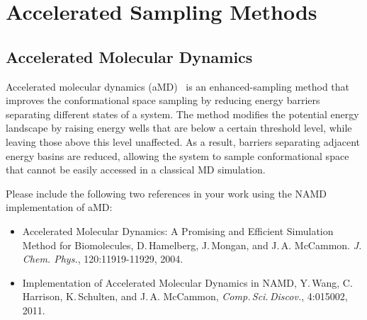 \section{Accelerated Sampling Methods}
\label{section:accel}

\subsection{Accelerated Molecular Dynamics}
\label{section:accelmd}
Accelerated molecular dynamics (aMD)~\cite{HAME2004mc} is an enhanced-sampling method that
improves the conformational space sampling by 
reducing energy barriers separating different states of a system.
The method modifies the potential 
energy landscape by raising energy wells that are below
a certain threshold level, while leaving those above this level unaffected.
As a result, barriers separating adjacent energy basins are reduced, allowing the system to sample
conformational space that cannot be easily accessed in a classical MD simulation.

Please include the following two references in your work using the NAMD implementation of aMD:
\begin{itemize}
  \item {Accelerated Molecular Dynamics: A Promising and Efficient Simulation Method for Biomolecules, D.\,Hamelberg, J.\,Mongan, and J.\,A. McCammon. {\it J. Chem. Phys.}, 120:11919-11929, 2004.}
  \item{Implementation of Accelerated Molecular Dynamics in NAMD, Y.\,Wang, C.\,Harrison, K.\,Schulten, and J.\,A. McCammon, {\it Comp.\,Sci.\,Discov.}, 4:015002, 2011.}
\end{itemize}

